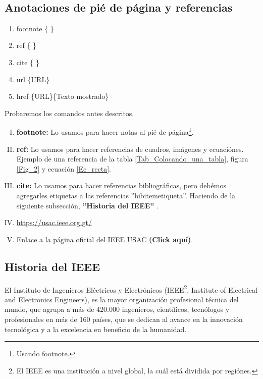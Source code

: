 \documentclass[12pt,letterpaper, onecolumn]{article}
\begin{document}
\\
\begin{multicols}{2}

\section{Anotaciones de pié de página y referencias}

\begin{enumerate}
    \item footnote \{ \}
    
    \item ref \{ \}
    
    \item cite \{ \}
    
    \item url \{URL\}
    
    \item href \{URL\}\{Texto mostrado\}
\end{enumerate}

Probaremos los comandos antes descritos.\\

\begin{enumerate}[I)]
    \item \textbf{footnote:} Lo usamos para hacer notas al pié de página\footnote{Usando footnote.}.
    
    \item \textbf{ref:} Lo usamos para hacer referencias de cuadros, imágenes y ecuaciónes. Ejemplo de una referencia de la tabla \ref{Tab_Colocando_una_tabla}, figura \ref{Fig_2} y ecuación \ref{Ec_recta}.
    
    \item \textbf{cite:} Lo usamos para hacer referencias bibliográficas, pero debémos agregarles etiquetas a las referencias ''bibitem{etiqueta}''. Haciendo de la siguiente subsección, \textbf{''Historia del IEEE''} \cite{biblio_4}.
    
    \item \url{https://usac.ieee.org.gt/}
    
    \item \href{https://usac.ieee.org.gt/}{Enlace a la página oficial del IEEE USAC \textbf{(Click aquí)}.}
    
\end{enumerate}

\subsection{Historia del IEEE}
El Instituto de Ingenieros Eléctricos y Electrónicos (IEEE\footnote{El IEEE es una institución a nivel global, la cuál está dividida por regiónes.}, Institute of Electrical and Electronics Engineers), es la mayor organización profesional técnica del mundo, que agrupa a más de  420.000 ingenieros, científicos, tecnólogos y profesionales en más de 160 países, que se dedican al avance en la innovación tecnológica y a la excelencia en beneficio de la humanidad.\\


\end{multicols}
\end{document}
